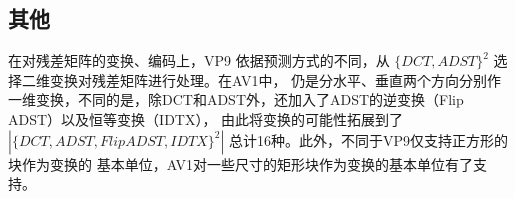 
\subsection{其他}

在对残差矩阵的变换、编码上，VP9 依据预测方式的不同，从 $\{DCT, ADST\}^2$ 选择二维变换对残差矩阵进行处理。在AV1中，
仍是分水平、垂直两个方向分别作一维变换，不同的是，除DCT和ADST外，还加入了ADST的逆变换（Flip ADST）以及恒等变换（IDTX），
由此将变换的可能性拓展到了 $|\{DCT, ADST, FlipADST, IDTX\}^2|$ 总计16种。此外，不同于VP9仅支持正方形的块作为变换的
基本单位，AV1对一些尺寸的矩形块作为变换的基本单位有了支持。

